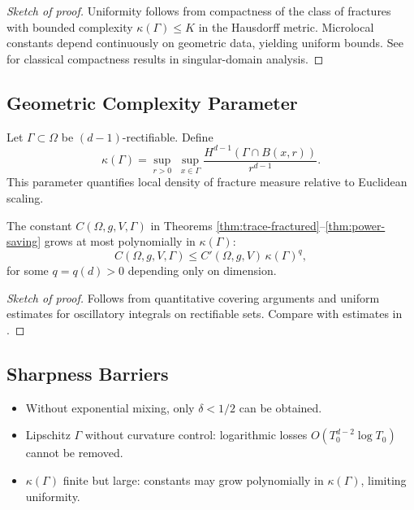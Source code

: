 \begin{proof}[Sketch of proof]
Uniformity follows from compactness of the class of fractures with bounded
complexity $\kappa(\Gamma)\leq K$ in the Hausdorff metric. Microlocal constants
depend continuously on geometric data, yielding uniform bounds. See
\cite{MazyaPlamenevskii1980, Kondratiev1990} for classical compactness results
in singular-domain analysis.
\end{proof}

\subsection*{Geometric Complexity Parameter}
\begin{definition}
Let $\Gamma\subset\Omega$ be $(d-1)$-rectifiable. Define
\[
\kappa(\Gamma) =
\sup_{r>0}\; \sup_{x\in\Gamma}
\frac{H^{d-1}(\Gamma\cap B(x,r))}{r^{d-1}}.
\]
This parameter quantifies local density of fracture measure relative to
Euclidean scaling.
\end{definition}

\begin{proposition}
\label{prop:kappa-dependence}
The constant $C(\Omega,g,V,\Gamma)$ in Theorems
\ref{thm:trace-fractured}--\ref{thm:power-saving} grows at most polynomially in
$\kappa(\Gamma)$:
\[
C(\Omega,g,V,\Gamma) \leq C'(\Omega,g,V)\, \kappa(\Gamma)^q,
\]
for some $q=q(d)>0$ depending only on dimension.
\end{proposition}

\begin{proof}[Sketch of proof]
Follows from quantitative covering arguments and uniform estimates for
oscillatory integrals on rectifiable sets. Compare with estimates in
\cite{Mattila1995, MazyaPlamenevskii1980}.
\end{proof}

\subsection*{Sharpness Barriers}
\begin{itemize}
  \item Without exponential mixing, only $\delta < 1/2$ can be obtained.
  \item Lipschitz $\Gamma$ without curvature control: logarithmic losses
  $O(T_0^{d-2}\log T_0)$ cannot be removed.
  \item $\kappa(\Gamma)$ finite but large: constants may grow polynomially in
  $\kappa(\Gamma)$, limiting uniformity.
\end{itemize}

